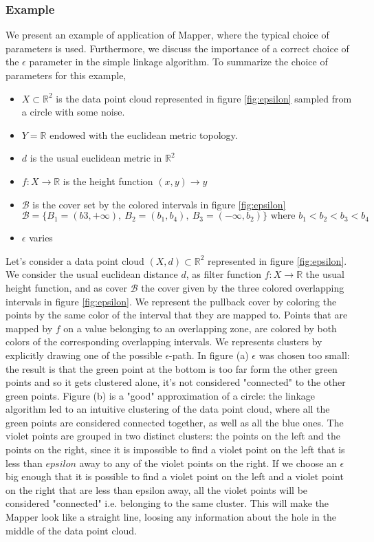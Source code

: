 \subsubsection {Example}
We present an example of application of Mapper, where the typical choice of parameters is used. Furthermore, we discuss the importance of a correct choice of the $\epsilon$ parameter in the simple linkage algorithm.
To summarize the choice of parameters for this example,
\begin{itemize}
	\item $X \subset \mathbb{R}^2$ is the data point cloud represented in figure \ref{fig:epsilon} sampled from a circle with some noise.
	\item  $Y=\mathbb{R}$ endowed with the euclidean metric topology. 
	\item $d$ is the usual euclidean metric in $\mathbb{R}^2$
	\item $f : X \rightarrow \mathbb{R}$ is the height function $(x,y) \rightarrow y$
	\item $\mathcal{B}$ is the cover set by the colored intervals in figure \ref{fig:epsilon} $$\mathcal{B} = \{B_1=(b3,+\infty),\ B_2=(b_1,b_4),\ B_3=(-\infty,b_2)\} \text{ where } b_1<b_2<b_3<b_4$$
	\item $\epsilon$ varies
\end{itemize}
Let's consider a data point cloud $(X,d) \subset \mathbb{R}^2$ represented in figure \ref{fig:epsilon}. We consider the usual euclidean distance $d$, as filter function $f:X\rightarrow\mathbb{R}$ the usual height function, and as cover $\mathcal{B}$ the cover given by the three colored overlapping intervals in figure \ref{fig:epsilon}. We represent the pullback cover by coloring the points by the same color of the interval that they are mapped to. Points that are mapped by $f$ on a value belonging to an overlapping zone, are colored by both colors of the corresponding overlapping intervals. We represents clusters by explicitly drawing one of the possible $\epsilon$-path.
In figure (a) $\epsilon$ was chosen too small: the result is that the green point at the bottom is too far form the other green points and so it gets clustered alone, it's not considered "connected" to the other green points. Figure (b) is a "good" approximation of a circle: the linkage algorithm led to an intuitive clustering of the data point cloud, where all the green points are considered connected together, as well as all the blue ones. The violet points are grouped in two distinct clusters: the points on the left and the points on the right, since it is impossible to find a violet point on the left that is less than $epsilon$ away to any of the violet points on the right. If we choose an $\epsilon$ big enough that it is possible to find a violet point on the left and a violet point on the right that are less than epsilon away, all the violet points will be considered "connected" i.e. belonging to the same cluster. This will make the Mapper look like a straight line, loosing any information about the hole in the middle of the data point cloud.


